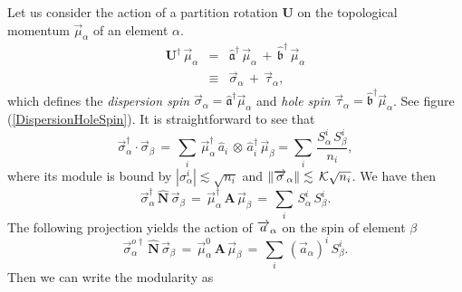 \documentclass[twocolumn,aps,sort,nofootinbib]{revtex4}
\begin{document}
Let us consider the action of a partition rotation $\mathbf{U}$ 
on the topological momentum $\overrightarrow{\mu}_\alpha$ of an
element $\alpha$.
\begin{eqnarray}
\mathbf{U}^\dagger\,\overrightarrow{\mu}_\alpha &=& 
\mathfrak{\hat{a}}^\dagger\,\overrightarrow{\mu}_\alpha
\,+\,
\mathfrak{\hat{b}}^\dagger\,\overrightarrow{\mu}_\alpha \nonumber\\
&\equiv & \overrightarrow{\sigma}_\alpha\,+\,\overrightarrow{\tau}_\alpha,
\end{eqnarray}
which defines the 
{\em dispersion spin} $\overrightarrow{\sigma}_\alpha = \mathfrak{\hat{a}}^\dagger\overrightarrow{\mu}_\alpha$ 
and {\em hole spin} $\overrightarrow{\tau}_\alpha  = \mathfrak{\hat{b}}^\dagger\overrightarrow{\mu}_\alpha$.
See figure (\ref{DispersionHoleSpin}). It is straightforward to see that
\begin{equation}
\overrightarrow{\sigma}_\alpha^\dagger\cdot\overrightarrow{\sigma}_\beta\,=\,
\sum_i\,\overrightarrow{\mu}_\alpha^\dagger\,
\hat{a}_i\,\otimes\,\hat{a}_i^\dagger\,
\overrightarrow{\mu}_\beta
=\sum_i\,\frac{S^i_\alpha\, S^i_\beta}{n_i},
\end{equation}
where its module is bound by $|\sigma_\alpha^i | \lesssim \sqrt{n_i}$ 
and $\|\overrightarrow{\sigma}_\alpha\|\lesssim\,{\cal K}\sqrt{n_i}$.
We have then
\begin{equation}
\overrightarrow{\sigma}_\alpha^\dagger\,\mathbf{\hat{N}}\,\overrightarrow{\sigma}_\beta\,=\,
\overrightarrow{\mu}_\alpha^\dagger\,\mathbf{A}\,\overrightarrow{\mu}_\beta\,=\,
\sum_i\,S^i_\alpha\,S^i_\beta.
\end{equation}
The following projection yields the action of 
$\protect\overrightarrow{a}_\alpha$ on the spin of element $\beta$
\begin{equation}
\overrightarrow{\sigma}_\alpha^{o\dagger}\,\mathbf{\hat{N}}\,\overrightarrow{\sigma}_\beta\,=\,
\overrightarrow{\mu}^0_\alpha\,\mathbf{A}\,\overrightarrow{\mu}_\beta\,=\,
\sum_i\,\left(\overrightarrow{a}_\alpha\right)^i\,S^i_\beta.
\end{equation}
Then we can write the modularity as
\end{document}
